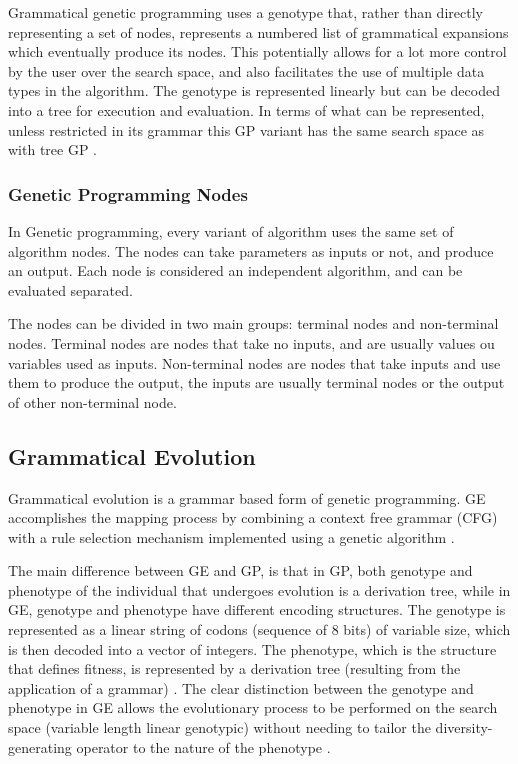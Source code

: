 \documentclass[journal]{IEEEtran}
\begin{document}
Grammatical genetic programming uses a genotype that, rather than directly representing a set of nodes, represents a numbered list of grammatical expansions which eventually produce its nodes. This potentially allows for a lot more control by the user over the search space, and also facilitates the use of multiple data types in the algorithm. The genotype is represented linearly but can be decoded into a tree for execution and evaluation. In terms of what can be represented, unless restricted in its grammar this GP variant has the same search space as with tree GP \cite{harris2015comparison}.

\subsubsection{Genetic Programming Nodes}

In Genetic programming, every variant of algorithm uses the same set of algorithm nodes. The nodes can take parameters as inputs or not, and produce an output. Each node is considered an independent algorithm, and can be evaluated separated.

The nodes can be divided in two main groups: terminal nodes and non-terminal nodes. Terminal nodes are nodes that take no inputs, and are usually values ou variables used as inputs. Non-terminal nodes are nodes that take inputs and use them to produce the output, the inputs are usually terminal nodes or the output of other non-terminal node.

\subsection{Grammatical Evolution}

Grammatical evolution is a grammar based form of genetic programming. GE accomplishes the mapping process by combining a context free grammar (CFG) with a rule selection mechanism implemented using a genetic algorithm \cite{byrne2015optimising}.

The main difference between GE and GP, is that in GP, both genotype and phenotype of the individual that undergoes evolution is a derivation tree, while in GE, genotype and phenotype have different encoding structures. The genotype is represented as a linear string of codons (sequence of 8 bits) of variable size, which is then decoded into a vector of integers. The phenotype, which is the structure that defines fitness, is represented by a derivation tree (resulting from the application of a grammar) \cite{cerri2013grammatical}. The clear distinction between the genotype and phenotype in GE allows the evolutionary process to be performed on the search space (variable length linear genotypic) without needing to tailor the diversity-generating operator to the nature of the phenotype \cite{sabar2013grammatical}.
\end{document}
